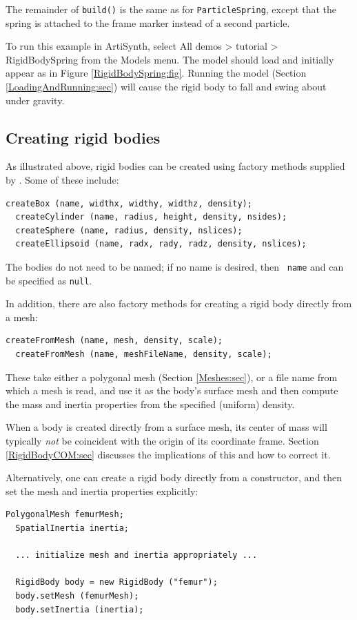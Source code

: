 The remainder of {\tt build()} is the same as for {\tt ParticleSpring},
except that the spring is attached to the frame marker instead of a
second particle.

To run this example in ArtiSynth, select {\sf All demos > tutorial >
RigidBodySpring} from the {\sf Models} menu. The model should load and
initially appear as in Figure \ref{RigidBodySpring:fig}.  Running the
model (Section \ref{LoadingAndRunning:sec}) will cause the rigid body
to fall and swing about under gravity.

\subsection{Creating rigid bodies}

As illustrated above, rigid bodies can be created using factory
methods supplied by .
Some of these include:
\begin{lstlisting}[]
  createBox (name, widthx, widthy, widthz, density);
  createCylinder (name, radius, height, density, nsides);
  createSphere (name, radius, density, nslices);
  createEllipsoid (name, radx, rady, radz, density, nslices);
\end{lstlisting}
%
The bodies do not need to be named; if no name is desired, then {\tt
name} and can be specified as {\tt null}.

In addition, there are also
factory methods for creating a rigid body directly from a mesh:
\begin{lstlisting}[]
  createFromMesh (name, mesh, density, scale);
  createFromMesh (name, meshFileName, density, scale);
\end{lstlisting}
%
These take either a polygonal mesh (Section \ref{Meshes:sec}), or a
file name from which a mesh is read, and use it as the body's surface
mesh and then compute the mass and inertia properties from the specified
(uniform) density.

\begin{sideblock}
When a body is created directly from a surface mesh, its center of
mass will typically {\it not} be coincident with the origin of its
coordinate frame. Section \ref{RigidBodyCOM:sec} discusses the
implications of this and how to correct it.
\end{sideblock}

Alternatively, one can create a rigid body directly from a
constructor, and then set the mesh and inertia properties explicitly:
%
\begin{lstlisting}[]
  PolygonalMesh femurMesh;
  SpatialInertia inertia;

  ... initialize mesh and inertia appropriately ...

  RigidBody body = new RigidBody ("femur");
  body.setMesh (femurMesh);
  body.setInertia (inertia);
\end{lstlisting}
%

